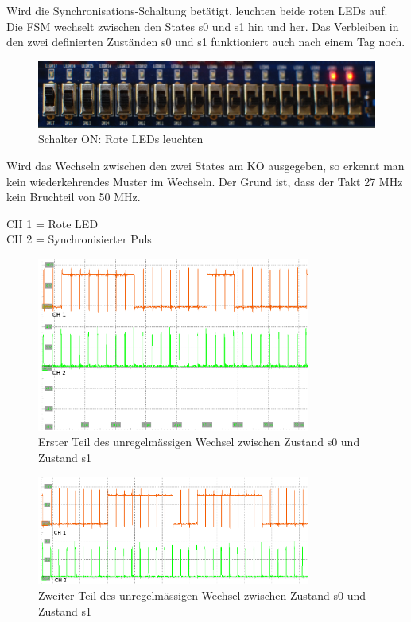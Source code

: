 Wird die Synchronisations-Schaltung betätigt, leuchten beide roten LEDs auf. Die FSM wechselt zwischen den States s0 und s1 hin und her. Das Verbleiben in den zwei definierten Zuständen s0 und s1 funktioniert auch nach einem Tag noch.

\begin{figure}[H]
	\includegraphics[width=1\textwidth]{images/metastability/synchronized.JPG}
	\caption{Schalter ON: Rote LEDs leuchten}
	\label{fig.metastabil.Ergebnis_BoardSynchron}
\end{figure}

\newpage
Wird das Wechseln zwischen den zwei States am KO ausgegeben, so erkennt man kein wiederkehrendes Muster im Wechseln. Der Grund ist, dass der Takt 27 MHz kein Bruchteil von 50 MHz.

CH 1 = Rote LED\\
CH 2 = Synchronisierter Puls

\begin{figure}[H]
	\includegraphics[width=0.8\textwidth]{images/metastability/synchron_eng_2.png}
	\caption{Erster Teil des unregelmässigen Wechsel zwischen Zustand s0 und Zustand s1}
	\label{fig.metastabil.Ergebnis_1}
\end{figure}

\begin{figure}[H]
	\includegraphics[width=0.8\textwidth]{images/metastability/synchron_eng_3.png}
	\caption{Zweiter Teil des unregelmässigen Wechsel zwischen Zustand s0 und Zustand s1}
	\label{fig.metastabil.Ergebnis_2}
\end{figure}

